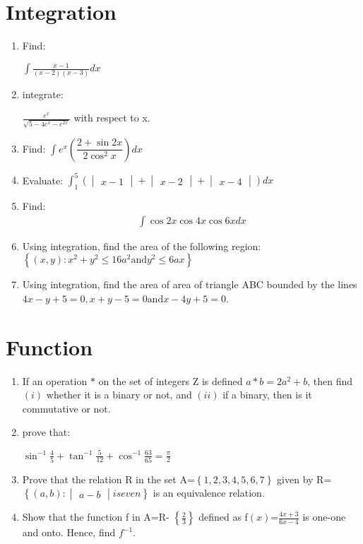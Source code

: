 \documentclass{article}
\providecommand{\brak}[1]{\ensuremath{\left(#1\right)}}
\providecommand{\cbrak}[1]{\ensuremath{\left\{#1\right\}}}
\newcommand{\mydet}[1]{\ensuremath{\begin{vmatrix}#1\end{vmatrix}}}
\begin{document}
\section{Integration}
\begin{enumerate}
\item Find:

		$\int\frac{x-1}{\brak{x-2}\brak{x-3}}dx$
\item integrate:

		$\frac{e^{x}}{\sqrt{5-4e^{x}-e^{2x}}}$ with respect to x.
\item Find:
$\int e^{x}\brak{\dfrac{2+\sin 2x}{2\cos^{2}x}} dx$
\item Evaluate:
	$\int_{1}^5 \brak{\mydet{x-1}+\mydet{x-2}+\mydet{x-4}}dx$
\item Find:\begin{align*}\int \cos2x\cos4x\cos6x dx \end{align*}
\item Using integration, find the area of the following region:$\cbrak{\brak{x, y}:x^{2}+y^{2} \leq16a^{2} \text {and} y^{2}\leq6ax}$
\item Using integration, find the area of area of triangle ABC bounded by the lines $ 4x-y+5=0,x+y-5=0 \text {and} x-4y+5=0$.
\end{enumerate}
\section{Function}
\begin{enumerate}
\item If an operation $\ast$ on the set of integers Z is defined $a \ast b = 2a^{2}+b$, then find \brak{i} whether it is a binary or not, and \brak{ii} if a binary, then is it commutative or not.
\item prove that:

	$\sin^{-1}\frac{4}{5}+\tan^{-1}\frac{5}{12}+\cos^{-1}\frac{63}{65}=\frac{\pi}{2}$
\item Prove that the relation R in the set A=$\cbrak{1, 2, 3, 4, 5, 6, 7}$ given by R=\cbrak{\brak{a, b}:\mydet{a-b} is   even} is an equivalence relation.
\item Show that the function f in A=R- $\cbrak{\frac{2}{3}}$ defined as f\brak{x}=$\frac{4x+3}{6x-4}$ is one-one and onto. Hence, find $f^{-1}$.
\end{enumerate}
\end{document}
